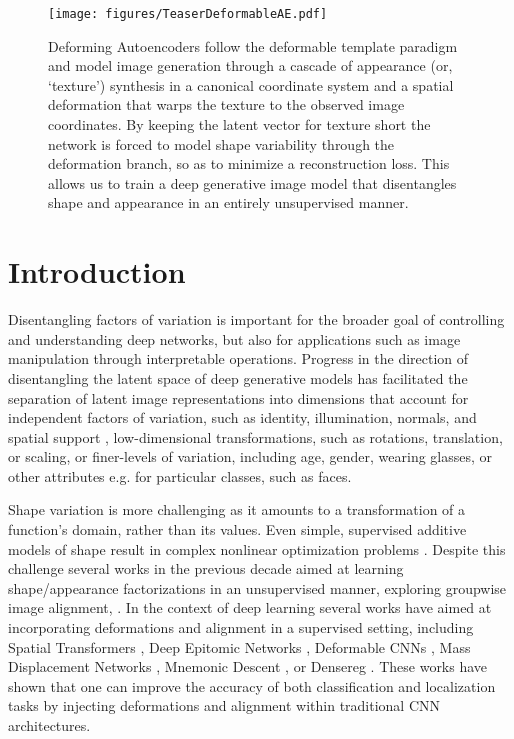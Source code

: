 \documentclass[runningheads]{llncs}
\begin{document}
\newcommand{\comment}[1]{}
\newcommand{\mycomment}[1]{}

\newcommand{\reffig}[1]{Fig.~\ref{#1}}

\begin{figure}[ht!]
    \vspace{-1.1 cm}
    \centering
    \texttt{[image: figures/TeaserDeformableAE.pdf]}
    \caption{ Deforming Autoencoders follow the deformable template paradigm and model image generation through a cascade of appearance (or, `texture') synthesis in a canonical coordinate system and a spatial deformation that warps the texture to the observed image coordinates. By keeping the latent vector for  texture  short the network is forced to model shape variability through the deformation branch, so as to minimize a reconstruction loss.
    This allows us to train  a deep generative image model that disentangles shape and appearance in an entirely unsupervised manner.}
    \label{fig:teaser}
     \vspace{-0.8cm}
\end{figure}


\section{Introduction}
Disentangling factors of variation is important for the broader goal of 
controlling and understanding deep networks, but also for applications such as image manipulation through interpretable operations.
Progress  in the direction of disentangling the latent space of deep generative models has  facilitated the separation of  latent image representations into dimensions that account for independent factors of variation, such as identity, illumination, normals, and spatial support \cite{infogan,ShuYHSSS17,brostow17,sengupta2017sfsnet}, low-dimensional  transformations, such as rotations, translation, or scaling, 
\cite{hinton10,WorrallGTB16,park2017transformation}
or finer-levels of variation, including age, gender, wearing glasses, or other attributes e.g. \cite{ShuYHSSS17,fader} for particular classes, such as faces. 

Shape variation is more challenging as it amounts to a transformation of a function's domain, rather than its values. Even simple, supervised additive models of shape  result in complex nonlinear optimization problems \cite{cootes1998active,MaBa04}. Despite this challenge
several works in the previous decade aimed at learning shape/appearance factorizations in an unsupervised manner, exploring groupwise image alignment, \cite{congealing,iccv07,FreyJ03,epitome}. In the context of deep learning several works have aimed at incorporating deformations and alignment in a supervised setting, including Spatial Transformers \cite{JaderbergSZK15}, Deep Epitomic Networks \cite{PapandreouKS15}, Deformable CNNs \cite{DaiQXLZHW17},  Mass Displacement Networks \cite{neverova}, Mnemonic Descent \cite{trigeorgis2016mnemonic}, or Densereg \cite{guler2016densereg}. These works have shown that  one can  improve the accuracy of both classification and localization tasks by injecting deformations and  alignment within traditional CNN architectures. 
\end{document}
